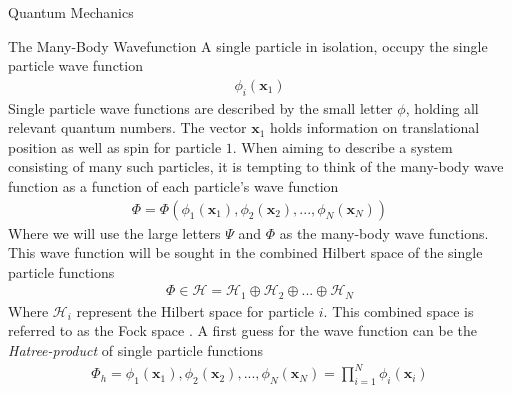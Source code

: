 \documentclass[twoside,english]{uiofysmaster}
\begin{document}
\begin{chapter}{Quantum Mechanics}
 	\begin{section}{The Many-Body Wavefunction}
 		A single particle in isolation, occupy the single particle wave function \cite{Audun,Crawford}
 		\begin{align}
 			\phi_i(\mathbf{x}_1)
 		\end{align}
 		Single particle wave functions are described by the small letter $\phi$, holding all relevant quantum numbers. The vector $\mathbf{x}_1$ holds information on translational position as well as spin for particle $1$. When aiming to describe a system consisting of many such particles, it is tempting to think of the many-body wave function as a function of each particle's wave function 
 		\begin{align}
 			\Phi = \Phi( \phi_1(\mathbf{x}_1), \phi_2(\mathbf{x}_2), ..., \phi_N(\mathbf{x}_N) )
 		\end{align}
 		Where we will use the large letters $\Psi$ and $\Phi$ as the many-body wave functions. This wave function will be sought in the combined Hilbert space of the single particle functions \cite{MHJSlides}
 		\begin{align}
 			\Phi \in \mathcal{H} = \mathcal{H}_1 \oplus \mathcal{H}_2 \oplus ... \oplus \mathcal{H}_N
 		\end{align}
 		Where $\mathcal{H}_i$ represent the Hilbert space for particle $i$. This combined space is referred to as the Fock space \cite{MHJSlides}. A first guess for the wave function can be the \textit{Hatree-product} of single particle functions \cite{Audun,ShavittAndBartlett,Szabo} 
 		\begin{align}
 			\Phi_h = \phi_1(\mathbf{x}_1), \phi_2(\mathbf{x}_2), ..., \phi_N(\mathbf{x}_N) = \prod_{i=1}^N \phi_i(\mathbf{x}_i)
 		\end{align}

 	\end{section}


\end{chapter}
\end{document}
